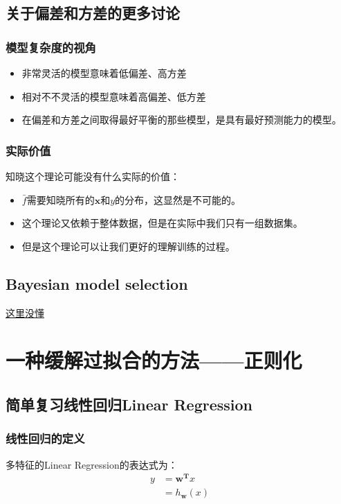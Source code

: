 \documentclass[12pt, letterpaper]{article}
\begin{document}
\subsection{关于偏差和方差的更多讨论}
\subsubsection*{模型复杂度的视角}
\begin{itemize}
\item 非常灵活的模型意味着低偏差、高方差
\item 相对不不灵活的模型意味着高偏差、低方差
\item 在偏差和方差之间取得最好平衡的那些模型，是具有最好预测能力的模型。
\end{itemize}
\subsubsection*{实际价值}
知晓这个理论可能没有什么实际的价值：
\begin{itemize}
\item $\bar{f}$需要知晓所有的$\mathbf{x}$和$y$的分布，这显然是不可能的。
\item 这个理论又依赖于整体数据，但是在实际中我们只有一组数据集。
\item 但是这个理论可以让我们更好的理解训练的过程。
\end{itemize}
\subsection{Bayesian model selection}
\href{http://alumni.media.mit.edu/~tpminka/statlearn/demo/}{这里没懂}


\section{一种缓解过拟合的方法——正则化}
\subsection{简单复习线性回归Linear Regression}
\subsubsection*{线性回归的定义}
多特征的Linear Regression的表达式为：
$$
\begin{aligned}
y &= \mathbf{w^T}x\\
&=h_{\mathbf{w}}(x)
\end{aligned}
$$
\end{document}
